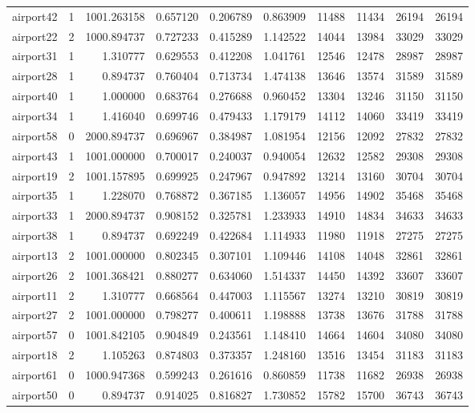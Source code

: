 \begin{longtable}{|l|r|r|r|r|r|r|r|r|r|}
airport42 & 1 & 1001.263158 & 0.657120 & 0.206789 & 0.863909 & 11488 & 11434 & 26194 & 26194 \\
airport22 & 2 & 1000.894737 & 0.727233 & 0.415289 & 1.142522 & 14044 & 13984 & 33029 & 33029 \\
airport31 & 1 & 1.310777 & 0.629553 & 0.412208 & 1.041761 & 12546 & 12478 & 28987 & 28987 \\
airport28 & 1 & 0.894737 & 0.760404 & 0.713734 & 1.474138 & 13646 & 13574 & 31589 & 31589 \\
airport40 & 1 & 1.000000 & 0.683764 & 0.276688 & 0.960452 & 13304 & 13246 & 31150 & 31150 \\
airport34 & 1 & 1.416040 & 0.699746 & 0.479433 & 1.179179 & 14112 & 14060 & 33419 & 33419 \\
airport58 & 0 & 2000.894737 & 0.696967 & 0.384987 & 1.081954 & 12156 & 12092 & 27832 & 27832 \\
airport43 & 1 & 1001.000000 & 0.700017 & 0.240037 & 0.940054 & 12632 & 12582 & 29308 & 29308 \\
airport19 & 2 & 1001.157895 & 0.699925 & 0.247967 & 0.947892 & 13214 & 13160 & 30704 & 30704 \\
airport35 & 1 & 1.228070 & 0.768872 & 0.367185 & 1.136057 & 14956 & 14902 & 35468 & 35468 \\
airport33 & 1 & 2000.894737 & 0.908152 & 0.325781 & 1.233933 & 14910 & 14834 & 34633 & 34633 \\
airport38 & 1 & 0.894737 & 0.692249 & 0.422684 & 1.114933 & 11980 & 11918 & 27275 & 27275 \\
airport13 & 2 & 1001.000000 & 0.802345 & 0.307101 & 1.109446 & 14108 & 14048 & 32861 & 32861 \\
airport26 & 2 & 1001.368421 & 0.880277 & 0.634060 & 1.514337 & 14450 & 14392 & 33607 & 33607 \\
airport11 & 2 & 1.310777 & 0.668564 & 0.447003 & 1.115567 & 13274 & 13210 & 30819 & 30819 \\
airport27 & 2 & 1001.000000 & 0.798277 & 0.400611 & 1.198888 & 13738 & 13676 & 31788 & 31788 \\
airport57 & 0 & 1001.842105 & 0.904849 & 0.243561 & 1.148410 & 14664 & 14604 & 34080 & 34080 \\
airport18 & 2 & 1.105263 & 0.874803 & 0.373357 & 1.248160 & 13516 & 13454 & 31183 & 31183 \\
airport61 & 0 & 1000.947368 & 0.599243 & 0.261616 & 0.860859 & 11738 & 11682 & 26938 & 26938 \\
airport50 & 0 & 0.894737 & 0.914025 & 0.816827 & 1.730852 & 15782 & 15700 & 36743 & 36743 \\

\end{longtable}
